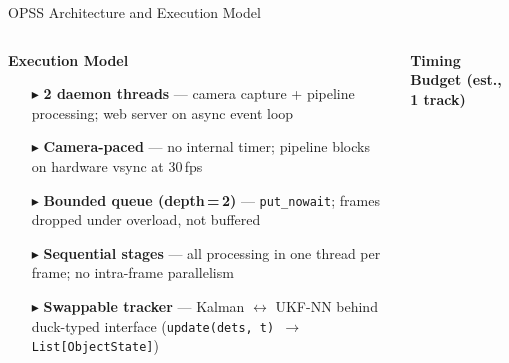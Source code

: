 \begin{frame}{OPSS Architecture and Execution Model}
\begin{center}
\end{center}

\vspace{-4pt}

\begin{columns}[T]

\begin{column}{0.52\textwidth}
\textbf{\small Execution Model}
\begin{itemize}[leftmargin=1.2em, itemsep=1pt, topsep=2pt]
  \item[\tiny$\blacktriangleright$] \textbf{2 daemon threads} --- camera capture +
        pipeline processing; web server on async event loop
  \item[\tiny$\blacktriangleright$] \textbf{Camera-paced} --- no internal timer;
        pipeline blocks on hardware vsync at 30\,fps
  \item[\tiny$\blacktriangleright$] \textbf{Bounded queue (depth\,=\,2)} ---
        \texttt{put\_nowait}; frames dropped under overload,
        not buffered
  \item[\tiny$\blacktriangleright$] \textbf{Sequential stages} --- all processing
        in one thread per frame; no intra-frame parallelism
  \item[\tiny$\blacktriangleright$] \textbf{Swappable tracker} --- Kalman $\leftrightarrow$
        UKF-NN behind duck-typed interface
        (\texttt{update(dets,\,t)\,$\to$\,List[ObjectState]})
\end{itemize}
\end{column}

\begin{column}{0.46\textwidth}
\textbf{\small Timing Budget (est., 1 track)}

\vspace{2pt}
\begin{tikzpicture}[
    >=Stealth,
    bar/.style={minimum height=0.35cm, anchor=west,
      font=\fontsize{4.5}{5.5}\selectfont\bfseries, text=white,
      inner sep=2pt, rounded corners=1pt},
    lbl/.style={font=\fontsize{4.5}{5.5}\selectfont, text=black!70,
      anchor=west},
  ]


\end{tikzpicture}
\end{column}
\end{columns}
\end{frame}
